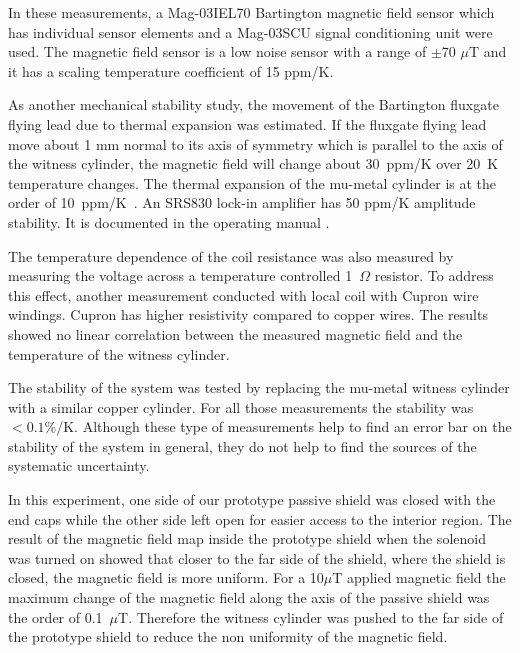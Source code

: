 

In these measurements, a Mag-03IEL70 Bartington magnetic field sensor which has individual sensor elements and a Mag-03SCU signal conditioning unit were used.
The magnetic field sensor is a low noise sensor with a range of $\pm$70 $\mu$T and it has a scaling temperature coefficient of 15 ppm/K.


As another mechanical stability study, the movement of the Bartington
fluxgate flying lead due to thermal expansion was estimated. If the
fluxgate flying lead move about 1 mm normal to its axis of symmetry
which is parallel to the axis of the witness cylinder, the magnetic
field will change about 30~ppm/K over 20~K temperature changes.  The
thermal expansion of the mu-metal cylinder is at the order of
10~ppm/K~\cite{kruppvdm}.  An SRS830 lock-in amplifier has 50
ppm/K amplitude stability. It is documented in the operating
manual \cite{bib:lockin}.

The temperature dependence of the coil resistance was also measured by
measuring the voltage across a temperature controlled 1~$\Omega$
resistor.
To address this effect, another measurement conducted with local coil with Cupron wire windings. Cupron has higher resistivity compared to copper wires. The results showed no linear correlation between the measured magnetic field and the temperature of the witness cylinder.

The stability of the system was tested by replacing the mu-metal
witness cylinder with a similar copper cylinder. For all those
measurements the stability was $<0.1$\%/K. Although these type of
measurements help to find an error bar on the stability of the system
in general, they do not help to find the sources of the systematic
uncertainty.


In this experiment, one side of our prototype passive shield was
closed with the end caps while the other side left open for easier
access to the interior region. The result of the magnetic field map
inside the prototype shield when the solenoid was turned on showed
that closer to the far side of the shield, where the shield is closed,
the magnetic field is more uniform. For a 10$\mu$T applied magnetic
field the maximum change of the magnetic field along the axis of the
passive shield was the order of 0.1~$\mu$T.  Therefore the witness
cylinder was pushed to the far side of the prototype shield to reduce
the non uniformity of the magnetic field.

